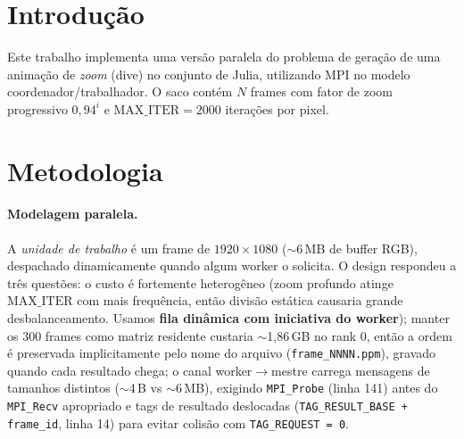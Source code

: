 \documentclass[twocolumn,a4paper,10pt]{article}
\begin{document}
\twocolumn[\begin{center}
  \vspace{-2em}
  {\normalsize Pontifícia Universidade Católica do Rio Grande do Sul - Programação Paralela - Prof Cesar De Rose}\par
  \vspace{0.4em}
  {\LARGE\bfseries Paralelização de Aplicação com a Biblioteca MPI}\par
  \vspace{0.5em}
  {\large Artur Marcon, Giovana Raupp e Vitoria Gonzalez}\par
  \vspace{1.5em}
\end{center}]

\section{Introdução}
Este trabalho implementa uma versão paralela do problema de geração de uma animação de \emph{zoom} (dive) no conjunto de Julia, utilizando MPI no modelo coordenador/trabalhador. O saco contém $N$ frames com fator de zoom progressivo $0{,}94^{i}$ e $\mathrm{MAX\_ITER}=2000$ iterações por pixel.

\section{Metodologia}
\paragraph{Modelagem paralela.} A \emph{unidade de trabalho} é um frame de $1920{\times}1080$ ($\sim$6\,MB de buffer RGB), despachado dinamicamente quando algum worker o solicita. O design respondeu a três questões: o custo é fortemente heterogêneo (zoom profundo atinge $\mathrm{MAX\_ITER}$ com mais frequência, então divisão estática causaria grande desbalanceamento. Usamos \textbf{fila dinâmica com iniciativa do worker}); manter os 300 frames como matriz residente custaria $\sim$1{,}86\,GB no rank 0, então a ordem é preservada implicitamente pelo nome do arquivo (\texttt{frame\_NNNN.ppm}), gravado quando cada resultado chega; o canal worker$\rightarrow$mestre carrega mensagens de tamanhos distintos ($\sim$4\,B vs $\sim$6\,MB), exigindo \texttt{MPI\_Probe} (linha 141) antes do \texttt{MPI\_Recv} apropriado e tags de resultado deslocadas (\texttt{TAG\_RESULT\_BASE + frame\_id}, linha 14) para evitar colisão com \texttt{TAG\_REQUEST = 0}.
\end{document}
